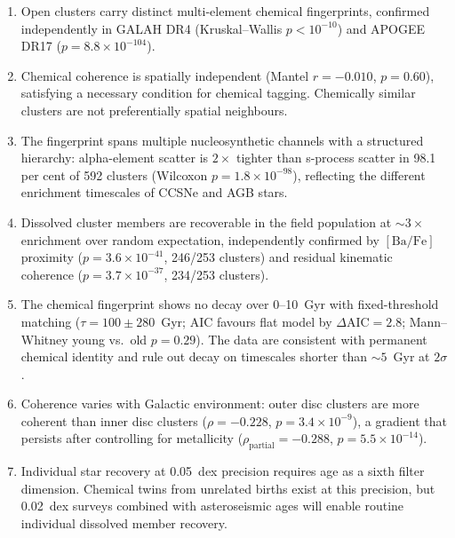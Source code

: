 \documentclass[fleqn,usenatbib]{mnras}
\newcommand{\bafe}{$\mathrm{[Ba/Fe]}$\xspace}
\begin{document}
\begin{enumerate}

\item Open clusters carry distinct multi-element chemical fingerprints, confirmed independently in GALAH DR4 (Kruskal--Wallis $p < 10^{-10}$) and APOGEE DR17 ($p = 8.8 \times 10^{-104}$).

\item Chemical coherence is spatially independent (Mantel $r = -0.010$, $p = 0.60$), satisfying a necessary condition for chemical tagging. Chemically similar clusters are not preferentially spatial neighbours.

\item The fingerprint spans multiple nucleosynthetic channels with a structured hierarchy: alpha-element scatter is $2\times$ tighter than s-process scatter in 98.1 per cent of 592 clusters (Wilcoxon $p = 1.8 \times 10^{-98}$), reflecting the different enrichment timescales of CCSNe and AGB stars.

\item Dissolved cluster members are recoverable in the field population at ${\sim}3\times$ enrichment over random expectation, independently confirmed by \bafe proximity ($p = 3.6 \times 10^{-41}$, 246/253 clusters) and residual kinematic coherence ($p = 3.7 \times 10^{-37}$, 234/253 clusters).

\item The chemical fingerprint shows no decay over 0--10~Gyr with fixed-threshold matching ($\tau = 100 \pm 280$~Gyr; AIC favours flat model by $\Delta\mathrm{AIC} = 2.8$; Mann--Whitney young vs.\ old $p = 0.29$). The data are consistent with permanent chemical identity and rule out decay on timescales shorter than ${\sim}5$~Gyr at $2\sigma$.

\item Coherence varies with Galactic environment: outer disc clusters are more coherent than inner disc clusters ($\rho = -0.228$, $p = 3.4 \times 10^{-9}$), a gradient that persists after controlling for metallicity ($\rho_{\mathrm{partial}} = -0.288$, $p = 5.5 \times 10^{-14}$).

\item Individual star recovery at 0.05~dex precision requires age as a sixth filter dimension. Chemical twins from unrelated births exist at this precision, but 0.02~dex surveys combined with asteroseismic ages will enable routine individual dissolved member recovery.

\end{enumerate}
\end{document}
